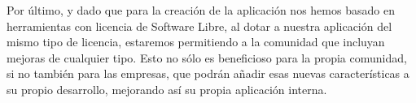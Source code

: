 \documentclass{\ClassPath/viu-tfm-template}
\begin{document}
Por último, y dado que para la creación de la aplicación nos hemos basado en herramientas con licencia de Software Libre, al dotar a nuestra aplicación del mismo tipo de licencia, estaremos permitiendo a la comunidad que incluyan mejoras de cualquier tipo. Esto no sólo es beneficioso para la propia comunidad, si no también para las empresas, que podrán añadir esas nuevas características a su propio desarrollo, mejorando así su propia aplicación interna.




\vfill

\pagebreak
\printbibliography[title={Referencias bibliográficas},heading=bibintoc]
\pagebreak

{
    \hypersetup{linkcolor = black}
    \listoffigures
}
\end{document}
